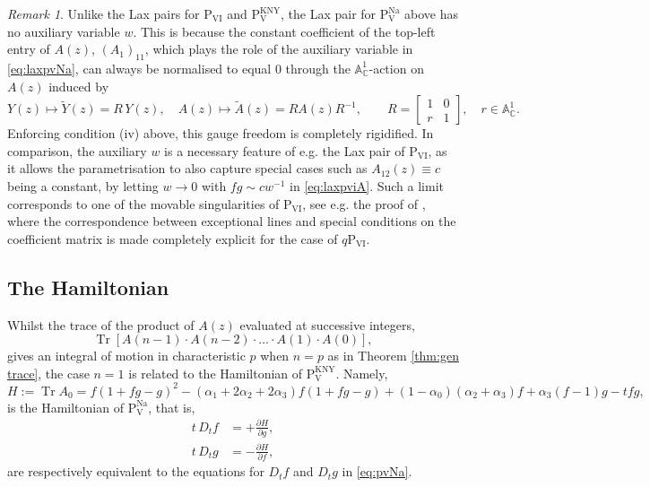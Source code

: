 \documentclass[a4paper,reqno]{amsart}
\numberwithin{equation}{section}
\numberwithin{figure}{section}
\theoremstyle{remark}
\newtheorem{remark}[theorem]{Remark}
\newcommand\Pfive{\textrm{P}_{\textrm{V}}}
\newcommand\Psix{\textrm{P}_{\textrm{VI}}}
\begin{document}
\begin{remark}\label{rem:nogaugew}
Unlike the Lax pairs for $\Psix$ and $\Pfive^\text{KNY}$, the Lax pair for $\Pfive^\text{Na}$ above has no auxiliary variable $w$. This is because the constant coefficient of the top-left entry of $A(z)$, $(A_1)_{11}$, which plays the role of the auxiliary variable in \eqref{eq:laxpvNa}, can always be normalised to equal $0$ through the $\mathbb{A}_\mathbb{C}^1$-action on $A(z)$ induced by
    \begin{equation}\label{eq:pivgaugefreedom}
     Y(z)\mapsto \widetilde{Y}(z)=R\,Y(z),\quad    A(z)\mapsto \widetilde{A}(z)=RA(z)R^{-1},\qquad R=\begin{bmatrix}
            1 &0\\
            r & 1
        \end{bmatrix},\quad r\in \mathbb{A}_\mathbb{C}^1.
    \end{equation}
Enforcing condition (iv) above, this gauge freedom is completely rigidified. In comparison, the auxiliary $w$ is a necessary feature of e.g. the Lax pair of $\Psix$, as it allows the parametrisation to also capture special cases such as $A_{12}(z)\equiv c$ being a constant, by letting $w\rightarrow 0$ with $fg\sim c w^{-1}$ in \eqref{eq:laxpviA}. Such a limit corresponds to one of the movable singularities of $\Psix$, see e.g. the proof of \cite[Lemma 2.5]{joshiroffelsencrystal}, where the correspondence between exceptional lines and special conditions on the coefficient matrix is made completely explicit for the case of $q\Psix$.
\end{remark}












\subsection{The Hamiltonian}Whilst the trace of the product of $A(z)$ evaluated at successive integers,
$$\operatorname{Tr}[A(n-1)\cdot A(n-2)\cdot\ldots\cdot A(1)\cdot A(0)],$$
gives an integral of motion in characteristic $p$ when $n=p$ as in Theorem \ref{thm:gen trace}, the case $n=1$ is related to the Hamiltonian of $\Pfive^\text{KNY}$. Namely,
\begin{equation*}
    H:=\operatorname{Tr}A_0=f(1+fg-g)^2-(\alpha_1+2\alpha_2+2\alpha_3)f(1+fg-g)+(1-\alpha_0)(\alpha_2+\alpha_3)f+\alpha_3(f-1)g-tfg,
\end{equation*}
is the Hamiltonian of $\Pfive^\text{Na}$, that is,
\begin{align*}
    t\,D_tf&=+\frac{\partial H}{\partial g},\\
    t\,D_tg&=-\frac{\partial H}{\partial f},
\end{align*}
are respectively equivalent to the equations for $D_tf$ and $D_tg$ in \eqref{eq:pvNa}.
\end{document}
